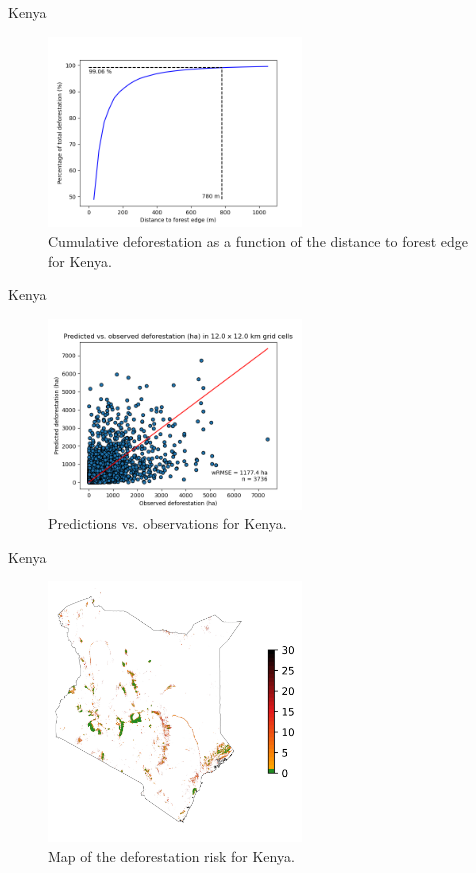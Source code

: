 \documentclass[10pt,table,dvipsnames,compress]{beamer}
\begin{document}
\begin{frame}[label={sec:orgff0d72b}]{Kenya}
\begin{figure}[htbp]
\centering
\includegraphics[width=0.6\textwidth]{figs/perc_dist_kenya.png}
\caption{Cumulative deforestation as a function of the distance to forest edge for Kenya.}
\end{figure}
\end{frame}

\begin{frame}[label={sec:orgaac6436}]{Kenya}
\begin{figure}[htbp]
\centering
\includegraphics[width=0.6\textwidth]{figs/pred_obs_kenya.png}
\caption{Predictions vs. observations for Kenya.}
\end{figure}
\end{frame}

\begin{frame}[label={sec:orgdb50a26}]{Kenya}
\begin{figure}[htbp]
\centering
\includegraphics[width=0.6\textwidth]{figs/riskmap_kenya.png}
\caption{Map of the deforestation risk for Kenya.}
\end{figure}
\end{frame}
\end{document}
